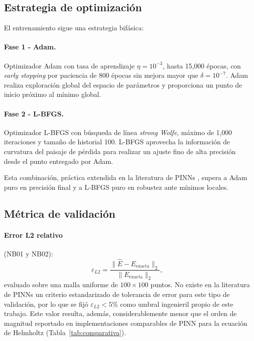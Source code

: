 \subsection{Estrategia de optimización}
\label{subsec:optimizacion}

El entrenamiento sigue una estrategia bifásica:

\paragraph{Fase 1 - Adam.}
Optimizador Adam con tasa de aprendizaje $\eta = 10^{-3}$, hasta 15{,}000 épocas,
con \textit{early stopping} por paciencia de 800 épocas sin mejora mayor que
$\delta = 10^{-7}$.
Adam realiza exploración global del espacio de parámetros y proporciona un punto
de inicio próximo al mínimo global.

\paragraph{Fase 2 - L-BFGS.}
Optimizador L-BFGS con búsqueda de línea \textit{strong Wolfe}, máximo de 1{,}000
iteraciones y tamaño de historial 100.
L-BFGS aprovecha la información de curvatura del paisaje de pérdida para realizar
un ajuste fino de alta precisión desde el punto entregado por Adam.

Esta combinación, práctica extendida en la literatura de PINNs \cite{Cuomo2022_review},
supera a Adam puro en precisión final y a L-BFGS puro en robustez ante mínimos locales.

\subsection{Métrica de validación}
\label{subsec:metricas}

\paragraph{Error L2 relativo} (NB01 y NB02):
%
\begin{equation}
  \varepsilon_{L2} = \frac{\|\hat{E} - E_{\mathrm{exacta}}\|_2}{\|E_{\mathrm{exacta}}\|_2},
  \label{eq:l2}
\end{equation}
%
evaluado sobre una malla uniforme de $100 \times 100$ puntos.
No existe en la literatura de PINNs un criterio estandarizado de tolerancia de error
para este tipo de validación, por lo que se fijó $\varepsilon_{L2} < 5\%$ como umbral
ingenieril propio de este trabajo. Este valor resulta, además, considerablemente menor
que el orden de magnitud reportado en implementaciones comparables de PINN para la
ecuación de Helmholtz (Tabla~\ref{tab:comparativa}).

